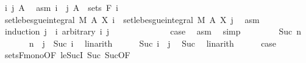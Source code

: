 \begin{isabellebody}
\ i\ j\ A\ \isamarkupfalse%
\ asm{\isacharcolon}{\kern0pt}\ {\isachardoublequoteopen}i\ {\isasymle}\ j{\isachardoublequoteclose}\ {\isachardoublequoteopen}A\ {\isasymin}\ sets\ {\isacharparenleft}{\kern0pt}F\ i{\isacharparenright}{\kern0pt}{\isachardoublequoteclose}\isanewline
\ \ \isamarkupfalse%
\ {\isachardoublequoteopen}set{\isacharunderscore}{\kern0pt}lebesgue{\isacharunderscore}{\kern0pt}integral\ M\ A\ {\isacharparenleft}{\kern0pt}X\ i{\isacharparenright}{\kern0pt}\ {\isacharequal}{\kern0pt}\ set{\isacharunderscore}{\kern0pt}lebesgue{\isacharunderscore}{\kern0pt}integral\ M\ A\ {\isacharparenleft}{\kern0pt}X\ j{\isacharparenright}{\kern0pt}{\isachardoublequoteclose}\ \isamarkupfalse%
\ asm\isanewline
\ \ \isamarkupfalse%
\ {\isacharparenleft}{\kern0pt}induction\ {\isachardoublequoteopen}j\ {\isacharminus}{\kern0pt}\ i{\isachardoublequoteclose}\ arbitrary{\isacharcolon}{\kern0pt}\ i\ j{\isacharparenright}{\kern0pt}\isanewline
\ \ \ \ \isamarkupfalse%
\ {}\isanewline
\ \ \ \ \isamarkupfalse%
\ \isamarkupfalse%
\ {\isacharquery}{\kern0pt}case\ \isamarkupfalse%
\ asm\ \isamarkupfalse%
\ simp\isanewline
\ \ \isamarkupfalse%
\isanewline
\ \ \ \ \isamarkupfalse%
\ {\isacharparenleft}{\kern0pt}Suc\ n{\isacharparenright}{\kern0pt}\isanewline
\ \ \ \ \isamarkupfalse%
\ {\isacharasterisk}{\kern0pt}{\isacharcolon}{\kern0pt}\ {\isachardoublequoteopen}n\ {\isacharequal}{\kern0pt}\ j\ {\isacharminus}{\kern0pt}\ Suc\ i{\isachardoublequoteclose}\ \isamarkupfalse%
\ linarith\isanewline
\ \ \ \ \isamarkupfalse%
\ {\isachardoublequoteopen}Suc\ i\ {\isasymle}\ j{\isachardoublequoteclose}\ \isamarkupfalse%
\ Suc{\isacharparenleft}{\kern0pt}{}{\isacharcomma}{\kern0pt}{}{\isacharparenright}{\kern0pt}\ \isamarkupfalse%
\ linarith\isanewline
\ \ \ \ \isamarkupfalse%
\ {\isacharquery}{\kern0pt}case\ \isamarkupfalse%
\ sets{\isacharunderscore}{\kern0pt}F{\isacharunderscore}{\kern0pt}mono{\isacharbrackleft}{\kern0pt}OF\ le{\isacharunderscore}{\kern0pt}SucI{\isacharbrackright}{\kern0pt}\ Suc{\isacharparenleft}{\kern0pt}{}{\isacharparenright}{\kern0pt}\ Suc{\isacharparenleft}{\kern0pt}{}{\isacharparenright}{\kern0pt}{\isacharbrackleft}{\kern0pt}OF\ {\isacharasterisk}{\kern0pt}{\isacharbrackright}{\kern0pt}\ \isamarkupfalse%

\end{isabellebody}
